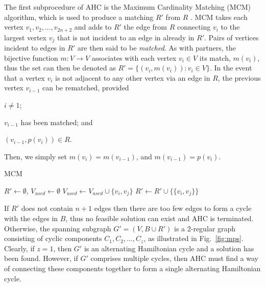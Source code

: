\documentclass[authoryear]{elsarticle}
\begin{document}
The first subprocedure of AHC is the Maximum Cardinality Matching (MCM) algorithm, which is used to produce a matching $R'$ from $R$ \citep{mahadev1994}. MCM takes each vertex $v_1, v_2,\dotsc,v_{2n+2}$ and adds to $R'$ the edge from $R$ connecting $v_i$ to the largest vertex $v_j$ that is not incident to an edge in already in $R'$. Pairs of vertices incident to edges in $R'$ are then said to be \emph{matched}. As with partners, the bijective function $m : V \to V$ associates with each vertex $v_i \in V$ its match, $m(v_i)$, thus the set can then be denoted as $R' = \{(v_i, m(v_i)): v_i \in V\}$. In the event that a vertex $v_i$ is not adjacent to any other vertex via an edge in $R$, the previous vertex $v_{i-1}$ can be rematched, provided 
\begin{enumerate*}[label={(\alph*)}]
	\item $i \neq 1$;
	\item $v_{i-1}$ has been matched; and
	\item $(v_{i-1}, p(v_i)) \in R$.
\end{enumerate*} 
Then, we simply set $m(v_i) = m(v_{i-1})$, and $m(v_{i-1}) = p(v_i)$. %

\begin{algorithm}
\caption{\textsc{MCM}}
\begin{algorithmic}[1]
	\State $R' \gets \emptyset$, $V_{used} \gets \emptyset$
				\State $V_{used} \gets V_{used} \cup \{v_i, v_j\}$
				\State $R' \gets R' \cup \{\{v_i, v_j\}\}$
				\Break
			\EndIf
		\EndFor
	\EndFor
\end{algorithmic}
\label{alg:mcm}	
\end{algorithm}	

If $R'$ does not contain $n+1$ edges then there are too few edges to form a cycle with the edges in $B$, thus no feasible solution can exist and AHC is terminated. Otherwise, the spanning subgraph $G'=(V, B \cup R')$ is a 2-regular graph consisting of cyclic components $C_1,C_2,\dotsc,C_z$, as illustrated in Fig.~\ref{fig:mps}. Clearly, if $z = 1$, then $G'$ is an alternating Hamiltonian cycle and a solution has been found. However, if $G'$ comprises multiple cycles, then AHC must find a way of connecting these components together to form a single alternating Hamiltonian cycle.
\end{document}
